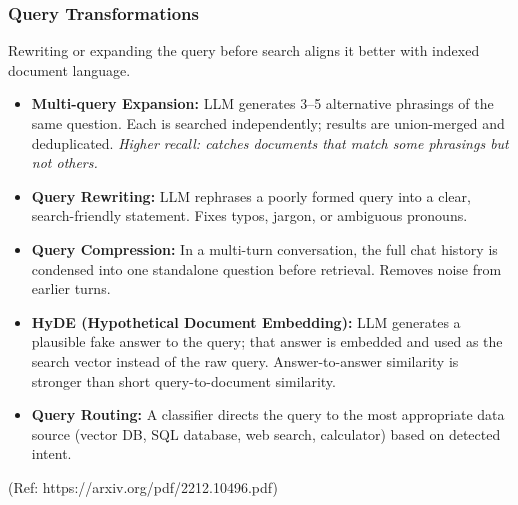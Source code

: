 \begin{frame}[fragile]\frametitle{Query Transformations}

Rewriting or expanding the query before search aligns it better with indexed document language.

\begin{itemize}
  \item \textbf{Multi-query Expansion:} LLM generates 3--5 alternative phrasings of the same question. Each is searched independently; results are union-merged and deduplicated.
    \textit{Higher recall: catches documents that match some phrasings but not others.}

  \item \textbf{Query Rewriting:} LLM rephrases a poorly formed query into a clear, search-friendly statement. Fixes typos, jargon, or ambiguous pronouns.

  \item \textbf{Query Compression:} In a multi-turn conversation, the full chat history is condensed into one standalone question before retrieval. Removes noise from earlier turns.

  \item \textbf{HyDE (Hypothetical Document Embedding):} LLM generates a plausible fake answer to the query; that answer is embedded and used as the search vector instead of the raw query. Answer-to-answer similarity is stronger than short query-to-document similarity.

  \item \textbf{Query Routing:} A classifier directs the query to the most appropriate data source (vector DB, SQL database, web search, calculator) based on detected intent.
\end{itemize}

{\tiny (Ref: https://arxiv.org/pdf/2212.10496.pdf)}

\end{frame}

